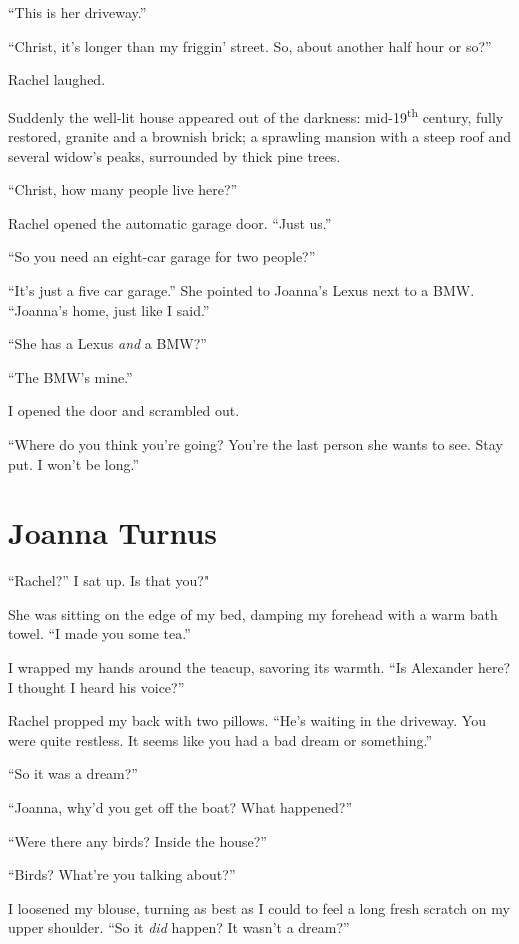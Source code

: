 ``This is her driveway.''

``Christ, it's longer than my friggin' street. So, about another half
hour or so?''

Rachel laughed.

Suddenly the well-lit house appeared out of the darkness:
mid-19\textsuperscript{th} century, fully restored, granite and a
brownish brick; a sprawling mansion with a steep roof and several
widow's peaks, surrounded by thick pine trees.

``Christ, how many people live here?''

Rachel opened the automatic garage door. ``Just us.''

``So you need an eight-car garage for two people?''

``It's just a five car garage.'' She pointed to Joanna's Lexus next to a
BMW. ``Joanna's home, just like I said.''

``She has a Lexus \emph{and} a BMW?''

``The BMW's mine.''

I opened the door and scrambled out.

``Where do you think you're going? You're the last person she wants to
see. Stay put. I won't be long.''

\chapter{Joanna Turnus}

\titlemark

``Rachel?'' I sat up. Is that you?"

She was sitting on the edge of my bed, damping my forehead with a warm
bath towel. ``I made you some tea.''

I wrapped my hands around the teacup, savoring its warmth. ``Is
Alexander here? I thought I heard his voice?''

Rachel propped my back with two pillows. ``He's waiting in the driveway.
You were quite restless. It seems like you had a bad dream or
something.''

``So it was a dream?''

``Joanna, why'd you get off the boat? What happened?''

``Were there any birds? Inside the house?''

``Birds? What're you talking about?''

I loosened my blouse, turning as best as I could to feel a long fresh
scratch on my upper shoulder. ``So it \emph{did} happen? It wasn't a
dream?''

